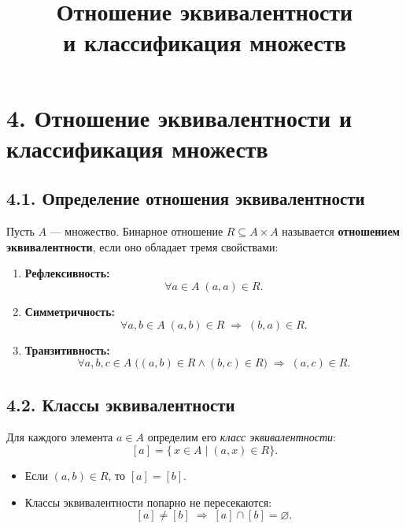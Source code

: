 \documentclass{article}
\begin{document}
\title{Отношение эквивалентности\\и классификация множеств}
\author{}
\date{}
\makeatletter
\renewcommand{\maketitle}{
  \begin{center}
    {\Large\mdseries\@title\par}
    \vspace{0.5em}
  \end{center}
}
\makeatother
\maketitle

\section*{4. Отношение эквивалентности и классификация множеств}

\subsection*{4.1. Определение отношения эквивалентности}

Пусть $A$ — множество. Бинарное отношение $R\subseteq A\times A$ называется \textbf{отношением эквивалентности}, если оно обладает тремя свойствами:
\begin{enumerate}[label=\arabic*)]
  \item \textbf{Рефлексивность:} 
    \[
      \forall a\in A\; (a,a)\in R.
    \]
  \item \textbf{Симметричность:} 
    \[
      \forall a,b\in A\; (a,b)\in R \;\Rightarrow\; (b,a)\in R.
    \]
  \item \textbf{Транзитивность:} 
    \[
      \forall a,b,c\in A\; \bigl((a,b)\in R \wedge (b,c)\in R\bigr) \;\Rightarrow\; (a,c)\in R.
    \]
\end{enumerate}

\subsection*{4.2. Классы эквивалентности}

Для каждого элемента $a\in A$ определим его \emph{класс эквивалентности}:
\[
  [a] = \{\,x\in A \mid (a,x)\in R\}.
\]
\begin{itemize}[leftmargin=*]
  \item Если $(a,b)\in R$, то $[a]=[b]$.
  \item Классы эквивалентности попарно не пересекаются:
    \[
      [a]\neq [b]\;\Longrightarrow\;[a]\cap [b]=\varnothing.
    \]
\end{itemize}
\end{document}
